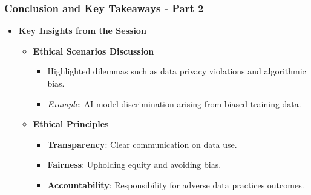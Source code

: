 \documentclass[aspectratio=169]{beamer}
\begin{document}
\begin{frame}[fragile]
    \frametitle{Conclusion and Key Takeaways - Part 2}
    \begin{itemize}
        \item \textbf{Key Insights from the Session}
            \begin{itemize}
                \item \textbf{Ethical Scenarios Discussion}
                    \begin{itemize}
                        \item Highlighted dilemmas such as data privacy violations and algorithmic bias.
                        \item \textit{Example}: AI model discrimination arising from biased training data.
                    \end{itemize}
                \item \textbf{Ethical Principles}
                    \begin{itemize}
                        \item \textbf{Transparency}: Clear communication on data use.
                        \item \textbf{Fairness}: Upholding equity and avoiding bias.
                        \item \textbf{Accountability}: Responsibility for adverse data practices outcomes.
                    \end{itemize}
            \end{itemize}
    \end{itemize}
\end{frame}
\end{document}
